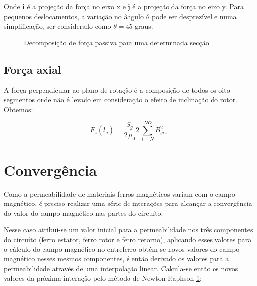 Onde $\boldsymbol{i}$ é a projeção da força no eixo x e $\boldsymbol{j}$ é a projeção da força no eixo y. Para pequenos deslocamentos, a variação no ângulo $\theta$ pode ser desprezível e numa simplificação, ser considerado como $\theta = 45$ graus.

\begin{figure}[!ht]
	\centering
	
	\caption{Decomposição de força passiva para uma determinada secção}
	\label{fig:Passivo:decomposicao}
\end{figure}

\subsection{Força axial}

A força perpendicular ao plano de rotação é a composição de todos os oito segmentos onde não é levado em consideração o efeito de inclinação do rotor. Obtemos:

\begin{equation}
F_z(l_g) = \frac{S_{g}}{2 \, \mu_0} 	2 \,\sum_{i=N}^{NO} B_{giz}^2
\end{equation}

\section{Convergência}

Como a permeabilidade de materiais ferros magnéticos variam com o campo magnético, é preciso realizar uma série de interações para alcançar a convergência do valor do campo magnético nas partes do circuíto. 

Nesse caso atribui-se um valor inicial para a permeabilidade nos três componentes do circuíto (ferro estator, ferro rotor e ferro retorno), aplicando esses valores para o cálculo do campo magnético no entreferro obtém-se novos valores do campo magnético nesses mesmos componentes, é então derivado os valores para a permeabilidade através de uma interpolação linear. Calcula-se então os novos valores da próxima interação pelo método de Newton-Raphson \ref{}: 



